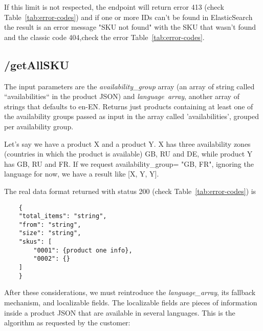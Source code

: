 If this limit is not respected, the endpoint will return error 413
(check Table~\ref{tab:error-codes}) and if one or more IDs can't be
found in ElasticSearch the result is an error message "SKU not found"
with the SKU that wasn't found and the classic code 404,check the
error Table~\ref{tab:error-codes}.

\subsection{/getAllSKU}
\label{sec:getallsku}
The input parameters  are the  \textit{availability\_group} array (an array of string called “availabilities“ in the product JSON) and 
\textit{language\ array}, another array of strings that defaults to en-EN. 
Returns just products containing at least one of the availability groups passed as input in the array called 'availabilities', grouped per availability group.

Let's say we have a product X and a product Y. X has three availability zones (countries in which the product is available)
GB, RU and DE, while product Y has GB, RU and FR. 
If we request   availability\_group= "GB, FR", ignoring the language for now, we have a result like
[X, Y, Y]. 

The real data format returned with status 200 (check Table~\ref{tab:error-codes}) is
\begin{lstlisting}
    {
    "total_items": "string",
    "from": "string",
    "size": "string",
    "skus": [
        "0001": {product one info},
        "0002": {} 
    ]
    }    
\end{lstlisting}

After these considerations, we must reintroduce the \textit{language\_array},  its fallback mechanism, and localizable fields.
The localizable fields are pieces of information inside a product JSON that are available in several languages. 
This is the algorithm as requested by the customer:

